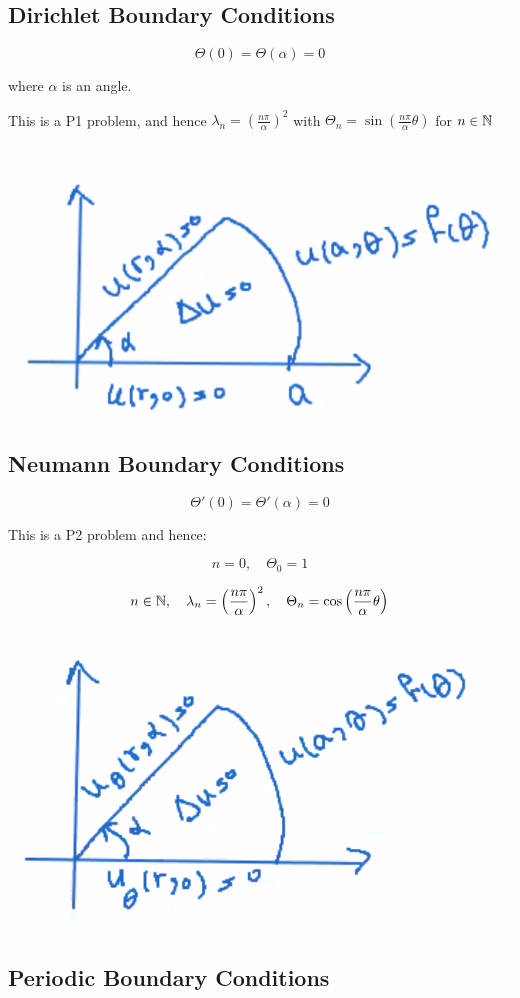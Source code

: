 \documentclass{article}
\begin{document}
\subsection*{Dirichlet Boundary Conditions}

$$\Theta(0) = \Theta(\alpha) = 0$$

where $\alpha$ is an angle.

This is a P1 problem, and hence $\lambda_n = \left( \frac{n \pi}{\alpha} \right)^2$ with $\Theta_n = \sin \left( \frac{n \pi}{\alpha} \theta \right)$ for $n \in \mathbb{N}$

\begin{center}
    \includegraphics[width = 0.6 \textwidth]{2.png}
\end{center}

\subsection*{Neumann Boundary Conditions}

$$\Theta' (0) = \Theta' (\alpha) = 0$$

This is a P2 problem and hence:

$$n = 0, \quad \Theta_0 = 1$$

$$n \in \mathbb{N}, \quad \lambda_n = \left( \frac{n \pi}{\alpha} \right)^2, \quad \Theta_n = \cos \left( \frac{n \pi}{\alpha} \theta \right)$$

\begin{center}
    \includegraphics[width = 0.6 \textwidth]{3.png}
\end{center}

\subsection*{Periodic Boundary Conditions}
\end{document}
